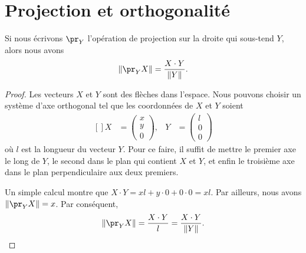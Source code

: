 \section{Projection et orthogonalité}

\begin{proposition}     \label{PropProjScal}
	Si nous écrivons \( \pr_Y\) l'opération de projection sur la droite qui sous-tend \( Y\), alors nous avons
	\begin{equation}
		\| \pr_YX \|=\frac{ X\cdot Y }{ \| Y \| }.
	\end{equation}
\end{proposition}

\begin{proof}
	Les vecteurs \( X\) et \( Y\) sont des flèches dans l'espace. Nous pouvons choisir un système d'axe orthogonal tel que les coordonnées de \( X\) et \( Y\) soient
	\begin{equation}
		\begin{aligned}[]
			X & =\begin{pmatrix}
				     x \\
				     y \\
				     0
			     \end{pmatrix},
			  & Y                & =\begin{pmatrix}
				                        l \\
				                        0 \\
				                        0
			                        \end{pmatrix}
		\end{aligned}
	\end{equation}
	où \( l\) est la longueur du vecteur \( Y\). Pour ce faire, il suffit de mettre le premier axe le long de \( Y\), le second dans le plan qui contient \( X\) et \( Y\), et enfin le troisième axe dans le plan perpendiculaire aux deux premiers.

	Un simple calcul montre que \( X\cdot Y=xl+y\cdot 0+0\cdot 0=xl\). Par ailleurs, nous avons \( \| \pr_YX \|=x\). Par conséquent,
	\begin{equation}
		\| \pr_YX \|=\frac{ X\cdot Y }{ l }=\frac{ X\cdot Y }{ \| Y \| }.
	\end{equation}
\end{proof}

